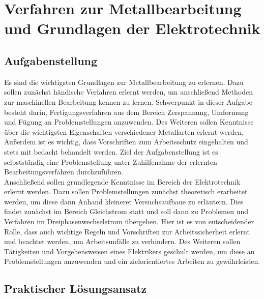 \chapter{Verfahren zur Metallbearbeitung und Grundlagen der Elektrotechnik}
\label{cha:Metallbearbeitung und Elektrotechnik}

\section{Aufgabenstellung}

Es sind die wichtigsten Grundlagen zur Metallbearbeitung zu erlernen. Dazu sollen zunächst händische Verfahren erlernt werden, um anschließend Methoden zur
maschinellen Bearbeitung kennen zu lernen. Schwerpunkt in dieser Aufgabe besteht darin, Fertigungsverfahren aus dem Bereich Zerspannung, Umformung und Fügung 
an Problemstellungen anzuwenden. Des Weiteren sollen Kenntnisse über die wichtigsten Eigenschaften verschiedener Metallarten erlernt werden. Außerdem ist es 
wichtig, dass Vorschriften zum Arbeitsschutz eingehalten und stets mit bedacht behandelt werden. Ziel der Aufgabenstellung ist es selbstständig eine
Problemstellung unter Zuhilfenahme der erlernten Bearbeitungsverfahren durchzuführen. \\
Anschließend sollen grundlegende Kenntnisse im Bereich der Elektrotechnik erlernt werden. Dazu sollen Problemstellungen zunächst theoretisch erarbeitet 
werden, um diese dann Anhand kleinerer Versuchsaufbaue zu erläutern. Dies findet zunächst im Bereich Gleichstrom statt und soll dann zu Problemen und 
Verfahren im Dreiphasenwechselstrom übergehen. Hier ist es von entscheidender Rolle, dass auch wichtige Regeln und Vorschriften zur Arbeitssicherheit erlernt und 
beachtet werden, um Arbeitsunfälle zu verhindern. Des Weiteren sollen Tätigkeiten und Vorgehensweisen eines Elektrikers geschult werden, um diese an 
Problemstellungen anzuwenden und ein zielorientiertes Arbeiten zu gewährleisten. 

\section{Praktischer Lösungsansatz}

